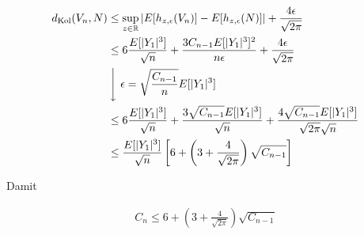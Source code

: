 \begin{align*}
d_\text{Kol}(V_n,N) & \le \sup_{z\in\mathbb R}\left|E[h_{z,\epsilon}(V_n)]-E[h_{z,\epsilon}(N)]\right|+\frac{4\epsilon}{\sqrt{2\pi}} \\
&\le 6\frac{E[|Y_1|^3]}{\sqrt n}+\frac{3C_{n-1}E[|Y_1|^3]^2}{n\epsilon}+\frac{4\epsilon}{\sqrt{2\pi}} \\
&\left\downarrow\ \epsilon = \sqrt{\frac{C_{n-1}}{n}}E[|Y_1|^3] \right. \\
&\le 6\frac{E[|Y_1|^3]}{\sqrt n}+\frac{3\sqrt{C_{n-1}}E[|Y_1|^3]}{\sqrt n}+\frac{4\sqrt{C_{n-1}}E[|Y_1|^3]}{\sqrt{2\pi}\sqrt{n}} \\
&\le \frac{E[|Y_1|^3]}{\sqrt n}\left[6+\left(3+\frac{4}{\sqrt{2\pi}}\right)\sqrt{C_{n-1}}\right] \\
\end{align*}

\noindent Damit

\begin{align*}
C_n \le 6 + \left(3 + \frac{4}{\sqrt{2\pi}}\right)\sqrt{C_{n-1}}
\end{align*}
